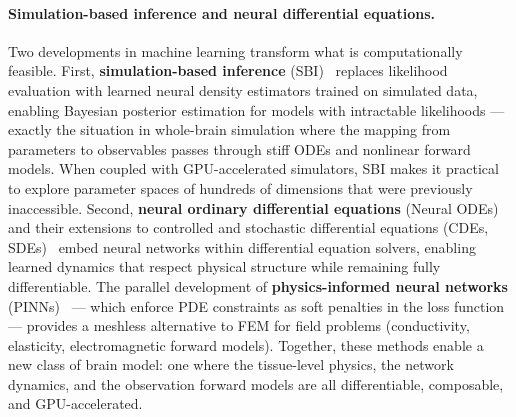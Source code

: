 \documentclass[11pt,a4paper]{article}\usepackage[]{graphicx}\usepackage[]{xcolor}
\begin{document}
\paragraph{Simulation-based inference and neural differential equations.}
Two developments in machine learning transform what is computationally
feasible. First, \textbf{simulation-based inference}
(SBI)~\citep{Cranmer2020sbi} replaces likelihood evaluation with
learned neural density estimators trained on simulated data, enabling
Bayesian posterior estimation for models with intractable likelihoods
--- exactly the situation in whole-brain simulation where the
mapping from parameters to observables passes through stiff ODEs and
nonlinear forward models. When coupled with GPU-accelerated
simulators, SBI makes it practical to explore parameter spaces of
hundreds of dimensions that were previously inaccessible. Second,
\textbf{neural ordinary differential equations}
(Neural ODEs)~\citep{Chen2018neuralode} and their extensions to
controlled and stochastic differential equations
(CDEs, SDEs)~\citep{Kidger2022neuralDE} embed neural networks within
differential equation solvers, enabling learned dynamics that respect
physical structure while remaining fully differentiable. The parallel
development of \textbf{physics-informed neural networks}
(PINNs)~\citep{Raissi2019pinns} --- which enforce PDE constraints as
soft penalties in the loss function --- provides a meshless alternative
to FEM for field problems (conductivity, elasticity, electromagnetic
forward models). Together, these methods enable a new class of
brain model: one where the tissue-level physics, the network dynamics,
and the observation forward models are all differentiable, composable,
and GPU-accelerated.
\end{document}
